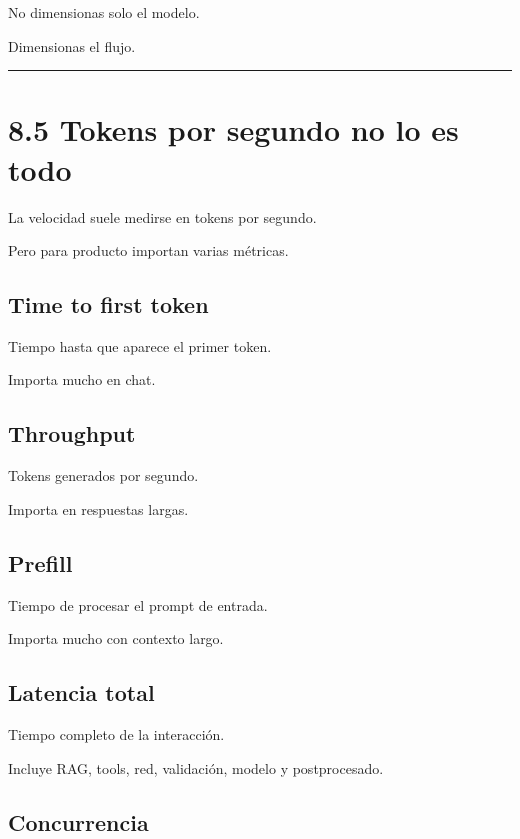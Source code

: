 No dimensionas solo el modelo.

Dimensionas el flujo.

\begin{center}\rule{0.5\linewidth}{0.5pt}\end{center}

\section{8.5 Tokens por segundo no lo es
todo}\label{tokens-por-segundo-no-lo-es-todo}

La velocidad suele medirse en tokens por segundo.

Pero para producto importan varias métricas.

\subsection{Time to first token}\label{time-to-first-token}

Tiempo hasta que aparece el primer token.

Importa mucho en chat.

\subsection{Throughput}\label{throughput}

Tokens generados por segundo.

Importa en respuestas largas.

\subsection{Prefill}\label{prefill}

Tiempo de procesar el prompt de entrada.

Importa mucho con contexto largo.

\subsection{Latencia total}\label{latencia-total}

Tiempo completo de la interacción.

Incluye RAG, tools, red, validación, modelo y postprocesado.

\subsection{Concurrencia}\label{concurrencia-1}

